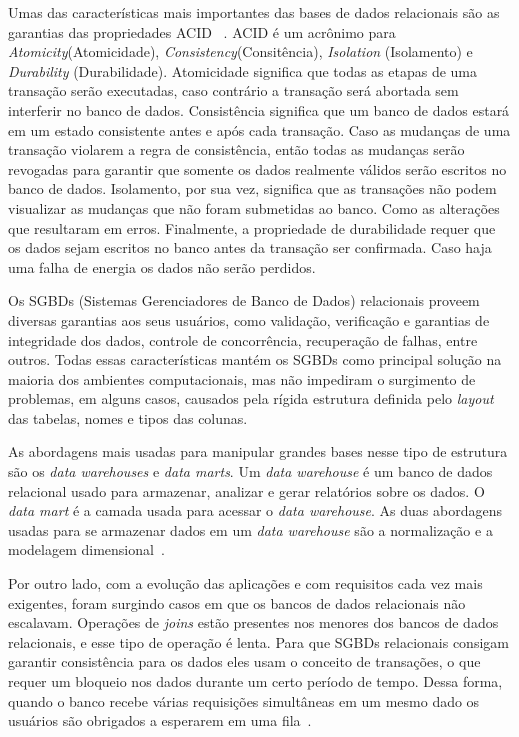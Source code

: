 Umas das características mais importantes das bases de dados relacionais são as garantias das propriedades ACID  ~\cite{Orendanalysisand}. ACID é um acrônimo para \textit{Atomicity}(Atomicidade), \textit{Consistency}(Consitência), \textit{Isolation} (Isolamento) e \textit{Durability} (Durabilidade).
Atomicidade significa que todas as etapas de uma transação serão executadas, caso contrário a transação será abortada sem interferir no banco de dados. Consistência significa que um banco de dados estará em um estado consistente antes e após cada transação. Caso as mudanças de uma transação violarem a regra de consistência, então todas as mudanças serão revogadas para garantir que somente os dados realmente válidos serão escritos no banco de dados. Isolamento, por sua vez, significa que as transações não podem visualizar as mudanças que não foram submetidas ao banco. Como as alterações que resultaram em erros. Finalmente, a propriedade de durabilidade requer que os dados sejam escritos no banco antes da transação ser confirmada. Caso haja uma falha de energia os dados não serão perdidos.

Os SGBDs (Sistemas Gerenciadores de Banco de Dados) relacionais proveem diversas garantias aos seus usuários, como validação, verificação e garantias de integridade dos dados, controle de concorrência, recuperação de falhas,  entre outros. Todas essas características mantém os SGBDs como principal solução na maioria dos ambientes computacionais, mas não impediram o surgimento de problemas, em alguns casos, causados pela rígida estrutura definida pelo \textit{layout} das tabelas, nomes e tipos das colunas.

As abordagens mais usadas para manipular grandes bases nesse tipo de estrutura são os \textit{data warehouses} e \textit{data marts}. Um \textit{data warehouse} é um banco de dados relacional usado para armazenar, analizar e gerar relatórios sobre os dados. O \textit{data mart} é a camada usada para acessar o \textit{data warehouse}. As duas abordagens usadas para se armazenar dados em um \textit{data warehouse} são a normalização e a modelagem dimensional~\cite{bigdataarchitectureandapproach}.

Por outro lado, com a evolução das aplicações e com requisitos cada vez mais exigentes, foram surgindo casos em que os bancos de dados relacionais não escalavam. Operações de \textit{joins} estão presentes nos menores dos bancos de dados relacionais, e esse tipo de operação é lenta. Para que SGBDs relacionais consigam garantir consistência para os dados eles usam o conceito de transações, o que requer um bloqueio nos dados durante um certo período de tempo.  Dessa forma, quando o banco recebe várias requisições simultâneas em um mesmo dado os usuários são obrigados a esperarem em uma fila~\cite{cassandraguide}.

